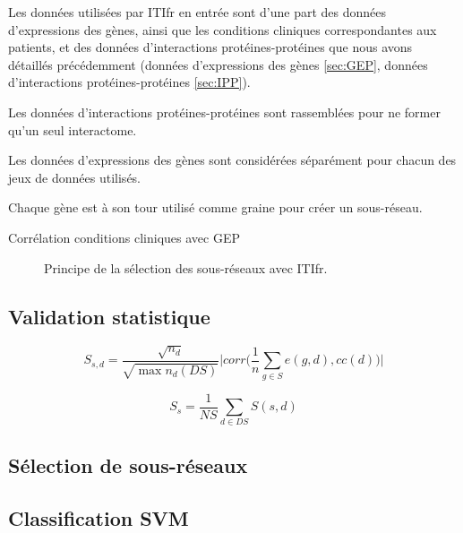       Les données utilisées par \acs{ITIfr} en entrée sont d'une part des données d'expressions des gènes, ainsi que les conditions cliniques correspondantes aux patients, et des données d'interactions protéines-protéines que nous avons détaillés précédemment (données d'expressions des gènes \ref{sec:GEP}, données d'interactions protéines-protéines \ref{sec:IPP}).

      Les données d'interactions protéines-protéines sont rassemblées pour ne former qu'un seul interactome.

      Les données d'expressions des gènes sont considérées séparément pour chacun des jeux de données utilisés.

      Chaque gène est à son tour utilisé comme graine pour créer un sous-réseau.

      Corrélation conditions cliniques avec GEP

      \begin{figure}
        \begin{center}
          \def\svgwidth{\columnwidth}
          \caption{Principe de la sélection des sous-réseaux avec \acl{ITIfr}.}
          \label{fig:Algorithme}
        \end{center}
      \end{figure}
      
    \subsection{\textcolor{mygreen}{Validation statistique}}

    \begin{equation}
    S_{s,d}=\frac{\sqrt{n_{d}}}{\sqrt{\max n_{d}(DS)}}\Bigg|corr\Bigg(\frac{1}{n}\sum_{g\in S}e(g,d),cc(d)\Bigg)\Bigg|
    \end{equation}

    \begin{equation}
    S_{s}=\frac{1}{NS}\sum_{d\in DS}S(s,d)
    \end{equation}

    \subsection{\textcolor{mygreen}{Sélection de sous-réseaux}}

    \subsection{\textcolor{mygreen}{Classification SVM}}

